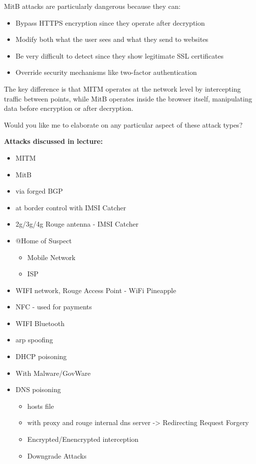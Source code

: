 MitB attacks are particularly dangerous because they can:
\begin{itemize}
  \item Bypass HTTPS encryption since they operate after decryption
  \item Modify both what the user sees and what they send to websites
  \item Be very difficult to detect since they show legitimate SSL certificates
  \item Override security mechanisms like two-factor authentication
\end{itemize}

The key difference is that MITM operates at the network level by intercepting traffic between points, while MitB operates inside the browser itself, manipulating data before encryption or after decryption.

Would you like me to elaborate on any particular aspect of these attack types?

\textbf{Attacks discussed in lecture:}
\begin{itemize}
  \item MITM
  \item MitB
  \item via forged BGP
  \item at border control with IMSI Catcher
  \item 2g/3g/4g Rouge antenna - IMSI Catcher
  \item @Home of Suspect 
  \begin{itemize}
    \item Mobile Network
    \item ISP
  \end{itemize}
  \item WIFI network, Rouge Access Point - WiFi Pineapple
  \item NFC - used for payments
  \item WIFI Bluetooth
  \item arp spoofing
  \item DHCP poisoning
  \item With Malware/GovWare
  \item DNS poisoning
  \begin{itemize}
    \item hosts file
    \item with proxy and rouge internal dns server -> Redirecting Request Forgery
    \item Encrypted/Enencrypted interception
    \item Downgrade Attacks
  \end{itemize}
\end{itemize}

